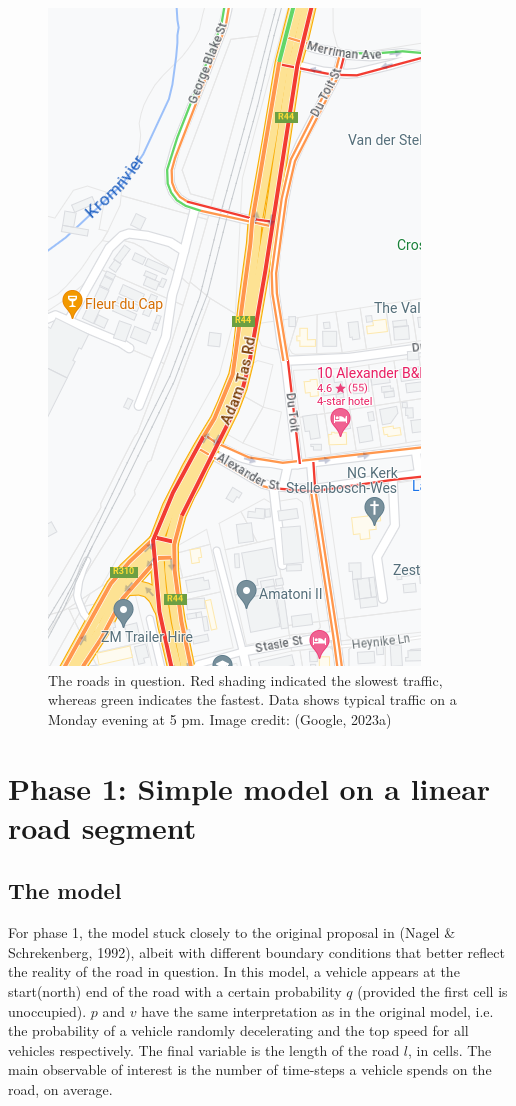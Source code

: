\documentclass{article}
\begin{document}
\begin{figure}
\includegraphics[scale = 0.75]{images/road.png}
\caption{\label{fig} The roads in question. Red shading indicated the slowest traffic, whereas green indicates the fastest. Data shows typical traffic on a Monday evening at 5 pm. Image credit: (Google, 2023a)}
\end{figure}

\section*{Phase 1: Simple model on a linear road segment}

\subsection*{The model}

For phase 1, the model stuck closely to the original proposal in (Nagel \& Schrekenberg, 1992), albeit with different boundary conditions that better reflect the reality of the road in question. In this model, a vehicle appears at the start(north) end of the road with a certain probability $q$ (provided the first cell is unoccupied). $p$ and $v$ have the same interpretation as in the original model, i.e. the probability of a vehicle randomly decelerating and the top speed for all vehicles respectively. The final variable is the length of the road $l$, in cells. The main observable of interest is the number of time-steps a vehicle spends on the road, on average.
\end{document}
